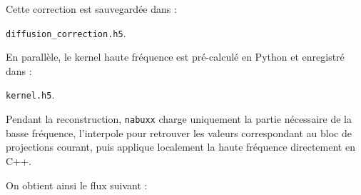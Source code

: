\documentclass[11pt,a4paper]{report}
\begin{document}
Cette correction est sauvegardée dans :

\begin{center}
\texttt{diffusion\_correction.h5}.
\end{center}

En parallèle, le kernel haute fréquence est pré-calculé en Python et
enregistré dans :

\begin{center}
\texttt{kernel.h5}.
\end{center}

Pendant la reconstruction, \texttt{nabuxx} charge uniquement la partie
nécessaire de la basse fréquence, l'interpole pour retrouver les valeurs
correspondant au bloc de projections courant, puis applique localement la
haute fréquence directement en C++.

On obtient ainsi le flux suivant :
\end{document}
